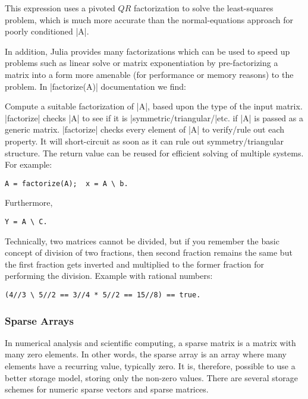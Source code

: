 This expression uses a pivoted $QR$ factorization to solve the least-squares problem, which is much more accurate than the normal-equations approach for poorly conditioned |A|.

In addition, Julia provides many factorizations which can be used to speed up problems such as linear solve or matrix exponentiation by pre-factorizing a matrix into a form more amenable (for performance or memory reasons) to the problem. In |factorize(A)| documentation \cite{julia:factorize} we find:

Compute a suitable factorization of |A|, based upon the type of the input matrix. |factorize| checks |A| to see if it is |symmetric/triangular/|etc. if |A| is passed as a generic matrix. |factorize| checks every element of |A| to verify/rule out each property. It will short-circuit as soon as it can rule out symmetry/triangular structure. The return value can be reused for efficient solving of multiple systems. For example: 
\begin{lstlisting}[language=JuliaLocal, style=julia]
  A = factorize(A);  x = A \ b. 
\end{lstlisting}

Furthermore, 
\begin{lstlisting}[language=JuliaLocal, style=julia]
  Y = A \ C.  
\end{lstlisting}

Technically, two matrices cannot be divided, but if you remember the basic concept of division of two fractions, then second fraction
 remains the same but the first fraction gets inverted and multiplied to the former fraction for performing the division. Example with rational numbers:  
\begin{lstlisting}[language=JuliaLocal, style=julia]
  (4//3 \ 5//2 == 3//4 * 5//2 == 15//8) == true. 
\end{lstlisting}


\subsubsection*{Sparse Arrays}

In numerical analysis and scientific computing, a sparse matrix is a matrix with many zero elements. In other words, the sparse array is an array where many elements have a recurring value, typically zero. It is, therefore, possible to use a better storage model, storing only the non-zero values. There are several storage schemes for numeric sparse vectors and sparse matrices.

